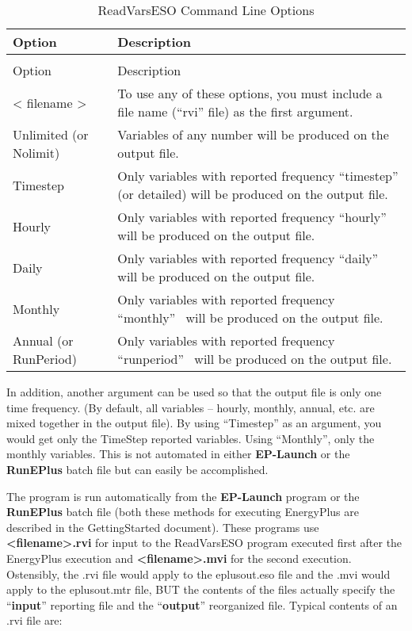\begin{longtable}[c]{p{1.5in}p{4.5in}}
\caption{ReadVarsESO Command Line Options \label{table:readvarseso-command-line-options}} \tabularnewline
\toprule 
Option & Description \tabularnewline
\midrule
\endfirsthead

\caption[]{ReadVarsESO Command Line Options} \tabularnewline
\toprule 
Option & Description \tabularnewline
\midrule
\endhead

< filename > & To use any of these options, you must include a file name (“rvi” file) as the first argument. \tabularnewline
Unlimited (or Nolimit) & Variables of any number will be produced on the output file. \tabularnewline
Timestep & Only variables with reported frequency “timestep” (or detailed) will be produced on the output file. \tabularnewline
Hourly & Only variables with reported frequency “hourly”~ will be produced on the output file. \tabularnewline
Daily & Only variables with reported frequency “daily”~ will be produced on the output file. \tabularnewline
Monthly & Only variables with reported frequency “monthly”~ will be produced on the output file. \tabularnewline
Annual (or RunPeriod) & Only variables with reported frequency “runperiod”~ will be produced on the output file. \tabularnewline
\bottomrule
\end{longtable}

In addition, another argument can be used so that the output file is only one time frequency. (By default, all variables -- hourly, monthly, annual, etc. are mixed together in the output file). By using ``Timestep'' as an argument, you would get only the TimeStep reported variables. Using ``Monthly'', only the monthly variables. This is not automated in either \textbf{EP-Launch} or the \textbf{RunEPlus} batch file but can easily be accomplished.

The program is run automatically from the \textbf{EP-Launch} program or the \textbf{RunEPlus} batch file (both these methods for executing EnergyPlus are described in the GettingStarted document). These programs use \textbf{\textless{}filename\textgreater{}.rvi} for input to the ReadVarsESO program executed first after the EnergyPlus execution and \textbf{\textless{}filename\textgreater{}.mvi} for the second execution. Ostensibly, the .rvi file would apply to the eplusout.eso file and the .mvi would apply to the eplusout.mtr file, BUT the contents of the files actually specify the ``\textbf{input}'' reporting file and the ``\textbf{output}'' reorganized file. Typical contents of an .rvi file are:

